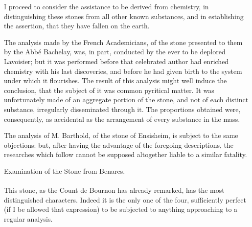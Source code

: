 \documentclass[a4paper, 12pt, oneside, twocolumn]{article}
\begin{document}
I proceed to consider the assistance to be derived from chemistry, in distinguishing these stones from all other known substances, and in establishing the assertion, that they have fallen on the earth.

The analysis made by the French Academicians, of the stone presented to them by the Abbé Bachelay, was, in part, conducted by the ever to be deplored Lavoisier; but it was performed before that celebrated author had enriched chemistry with his last discoveries, and before he had given birth to the system under which it flourishes. The result of this analysis might well induce the conclusion, that the subject of it was common pyritical matter. It was unfortunately made of an aggregate portion of the stone, and not of each distinct substance, irregularly disseminated through it. The proportions obtained were, consequently, as accidental as the arrangement of every substance in the mass.

The analysis of M. Barthold, of the stone of Ensisheim, is subject to the same objections: but, after having the advantage of the foregoing descriptions, the researches which follow cannot be supposed altogether liable to a similar fatality.
\begin{center}
Examination of the Stone from Benares.
\end{center}
\paragraph{}
This stone, as the Count de Bournon has already remarked, has the most distinguished characters. Indeed it is the only one of the four, sufficiently perfect (if I be allowed that expression) to be subjected to anything approaching to a regular analysis.
\end{document}
